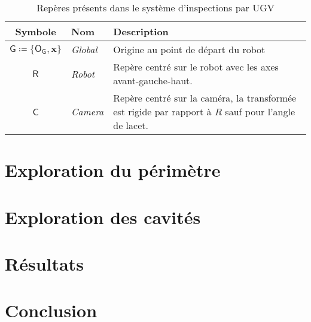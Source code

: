 \begin{table}[htp]
  \centering
  \setlength{\tabcolsep}{12pt}
  \begin{tabular}[htp]{|c|l|p{11cm}|}
    \hline
    Symbole & Nom                   & Description\\\hline
    $\mathsf{G} \coloneqq \{\mathsf{O_G}, \mathbf{x} \} $     &  \textit{Global}      & Origine au point de départ du robot\\\hline
    $\mathsf{R}$     &  \textit{Robot}       & Repère centré sur le robot avec les axes avant-gauche-haut.\\\hline
    $\mathsf{C}$     &  \textit{Camera}      & Repère centré sur la caméra, la transformée est rigide par rapport à $R$ sauf pour l'angle de lacet.\\\hline
  \end{tabular}
  \setlength{\tabcolsep}{6pt}
  \caption{Repères présents dans le système d'inspections par UGV}
  \label{table:ugv_frames}
\end{table}


\section{Exploration du périmètre} \label{sec:perimeter_exploration}



\section{Exploration des cavités}

\section{Résultats}

\section{Conclusion}
